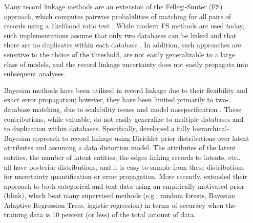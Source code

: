 \documentclass[11pt]{article}\usepackage[]{graphicx}\usepackage[]{color}
\begin{document}
Many record linkage methods are an extension of the Fellegi-Sunter (FS) approach, which computes pairwise probabilities of matching for all pairs of records using a likelihood ratio test \citep{fellegi_1969, newcombe_1959}.  While modern FS methods are used today, such implementations assume that only two databases can be linked and that there are no duplicates within each database \citep{gutman_2013, liseo_2011, murray2016probabilistic}. In addition, such approaches are sensitive to the choice of the threshold, are not easily generalizable to a large class of models, and the record linkage uncertainty does not easily propagate into subsequent analyses. 



Bayesian methods have been utilized in record linkage due to their flexibility and exact error propagation; however, they have been limited primarily to two-database matching, due to scalability issues and model misspecification \citep{copas_1990, gutman_2013, liseo_2011, Sadinle14, sadinle2016bayesian}.  These contributions, while valuable, do not easily generalize to multiple databases and to duplication within databases.  Specifically, \cite{steorts14smered, steorts??bayesian} developed a fully hierarchical-Bayesian approach to record linkage using Dirichlet prior distributions over latent attributes and assuming a data distortion model. 
The attributes of the latent entities, the number of latent entities, the edges linking records to latents, etc., all have posterior distributions, and it is easy to sample from these distributions for uncertainty quantification or error propagation.  
More recently, \citep{steorts15entity} extended their approach to both categorical and text data using an empirically motivated prior (blink), which beat many supervised methods (e.g., random forests, Bayesian Adaptive Regression Trees, logistic regression) in terms of accuracy when the training data is 10 percent (or less) of the total amount of data. 
\end{document}
